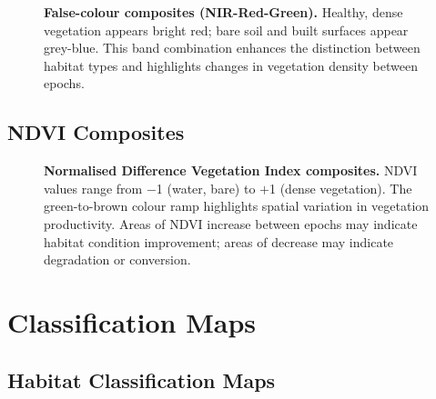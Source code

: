 \begin{figure}[H]
\centering
{}
\caption[False-colour composites highlighting vegetation vigour.]{%
\textbf{False-colour composites (NIR-Red-Green).} Healthy, dense vegetation appears bright red; bare soil and built surfaces appear grey-blue. This band combination enhances the distinction between habitat types and highlights changes in vegetation density between epochs.%
}
\label{fig:cat-fc-comparison}
\end{figure}

\subsection{NDVI Composites}

\begin{figure}[H]
\centering
{}
\caption[NDVI composites 2016 vs 2026.]{%
\textbf{Normalised Difference Vegetation Index composites.} NDVI values range from $-$1 (water, bare) to $+$1 (dense vegetation). The green-to-brown colour ramp highlights spatial variation in vegetation productivity. Areas of NDVI increase between epochs may indicate habitat condition improvement; areas of decrease may indicate degradation or conversion.%
}
\label{fig:cat-ndvi-comparison}
\end{figure}


\section{Classification Maps}

\subsection{Habitat Classification Maps}

